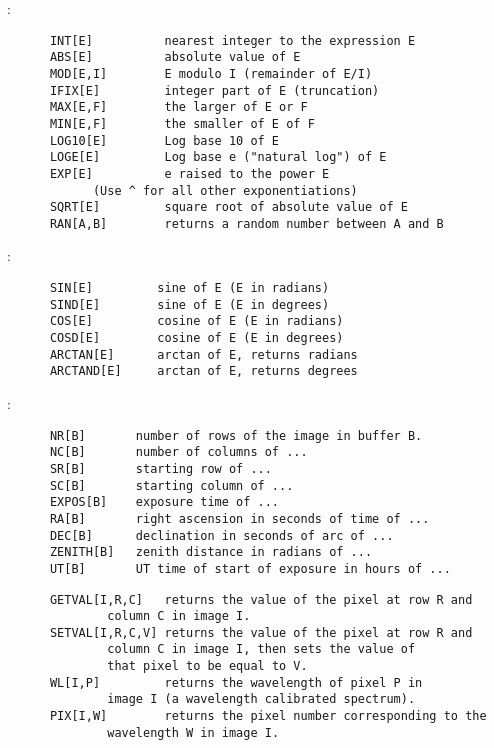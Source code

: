\noindent {}:
\begin{verbatim}
      INT[E]          nearest integer to the expression E
      ABS[E]          absolute value of E
      MOD[E,I]        E modulo I (remainder of E/I)
      IFIX[E]         integer part of E (truncation)
      MAX[E,F]        the larger of E or F
      MIN[E,F]        the smaller of E of F
      LOG10[E]        Log base 10 of E
      LOGE[E]         Log base e ("natural log") of E
      EXP[E]          e raised to the power E
			(Use ^ for all other exponentiations)
      SQRT[E]         square root of absolute value of E
      RAN[A,B]        returns a random number between A and B
\end{verbatim}

\noindent {}:
\begin{verbatim}
      SIN[E]         sine of E (E in radians)
      SIND[E]        sine of E (E in degrees)
      COS[E]         cosine of E (E in radians)
      COSD[E]        cosine of E (E in degrees)
      ARCTAN[E]      arctan of E, returns radians
      ARCTAND[E]     arctan of E, returns degrees
\end{verbatim}

\noindent {}:
\begin{verbatim}
      NR[B]       number of rows of the image in buffer B.
      NC[B]       number of columns of ...
      SR[B]       starting row of ...
      SC[B]       starting column of ...
      EXPOS[B]    exposure time of ...
      RA[B]       right ascension in seconds of time of ...
      DEC[B]      declination in seconds of arc of ...
      ZENITH[B]   zenith distance in radians of ...
      UT[B]       UT time of start of exposure in hours of ...
\end{verbatim}

\noindent {}
\begin{verbatim}
      GETVAL[I,R,C]   returns the value of the pixel at row R and
		      column C in image I.
      SETVAL[I,R,C,V] returns the value of the pixel at row R and
		      column C in image I, then sets the value of
		      that pixel to be equal to V.
      WL[I,P]         returns the wavelength of pixel P in
		      image I (a wavelength calibrated spectrum).
      PIX[I,W]        returns the pixel number corresponding to the
		      wavelength W in image I.
\end{verbatim}

